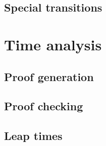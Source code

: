 \subsection{Special transitions}

\section{Time analysis}
\label{sec:timeanalysis}

\subsection{Proof generation}

\subsection{Proof checking}

\subsection{Leap times}
